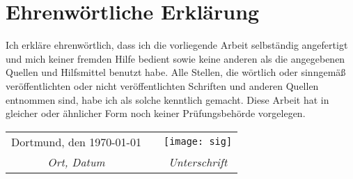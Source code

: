 \chapter*{Ehrenwörtliche Erklärung}\label{ch:declaration}
\thispagestyle{empty}
Ich erkläre ehrenwörtlich, dass ich die vorliegende Arbeit selbständig angefertigt und mich keiner fremden Hilfe bedient sowie keine anderen als die angegebenen Quellen und Hilfsmittel benutzt habe.
Alle Stellen, die wörtlich oder sinngemäß veröffentlichten oder nicht veröffentlichten Schriften und anderen Quellen entnommen sind, habe ich als solche kenntlich gemacht.
Diese Arbeit hat in gleicher oder ähnlicher Form noch keiner Prüfungsbehörde vorgelegen.
\vspace{1cm}
\begin{table}[h]
    \centering
    \begin{tabular}{@{}lll@{}}
    Dortmund, den \today                    & \hspace{1cm} & \texttt{[image: sig]}          \\ \cmidrule(r){1-1} \cmidrule(l){3-3} 
    \multicolumn{1}{c}{\textit{Ort, Datum}} &              & \multicolumn{1}{c}{\textit{Unterschrift}}
    \end{tabular}
\end{table}
